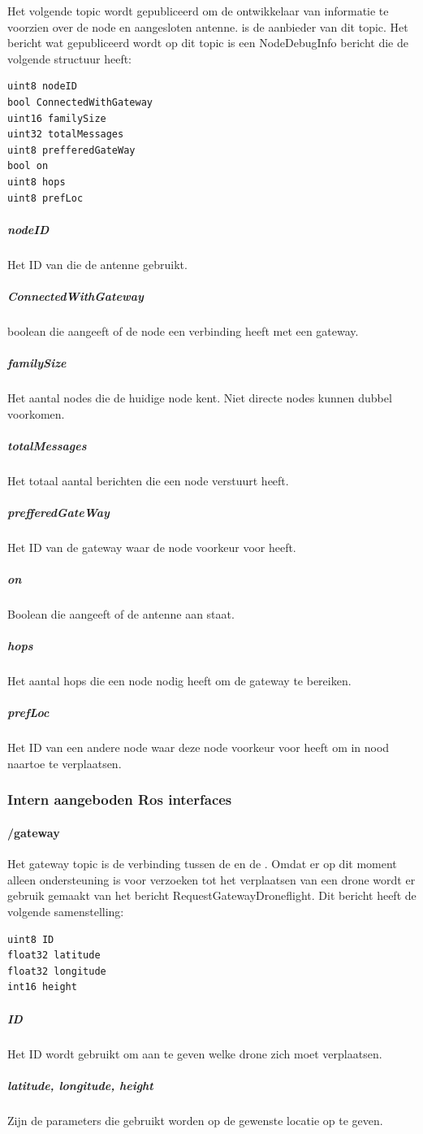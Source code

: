 \documentclass[a4paper, 11pt, oneside]{report}
\begin{document}
Het volgende topic wordt gepubliceerd om de ontwikkelaar van informatie te voorzien over de node en aangesloten antenne.
 is de aanbieder van dit topic.
Het bericht wat gepubliceerd wordt op dit topic is een NodeDebugInfo bericht die de volgende structuur heeft:
\begin{lstlisting}
uint8 nodeID
bool ConnectedWithGateway 
uint16 familySize
uint32 totalMessages
uint8 prefferedGateWay
bool on
uint8 hops
uint8 prefLoc
\end{lstlisting}

\subparagraph{nodeID} Het ID van die de antenne gebruikt. 
\subparagraph{ConnectedWithGateway} boolean die aangeeft of de node een verbinding heeft met een gateway.
\subparagraph{familySize} Het aantal nodes die de huidige node kent. Niet directe nodes kunnen dubbel voorkomen.
\subparagraph{totalMessages} Het totaal aantal berichten die een node verstuurt heeft.
\subparagraph{prefferedGateWay} Het ID van de gateway waar de node voorkeur voor heeft.
\subparagraph{on} Boolean die aangeeft of de antenne aan staat.
\subparagraph{hops} Het aantal hops die een node nodig heeft om de gateway te bereiken.
\subparagraph{prefLoc} Het ID van een andere node waar deze node voorkeur voor heeft om in nood naartoe te verplaatsen. 

\subsubsection{Intern aangeboden Ros interfaces}
\label{DetailedDesign:ros:intern:rosinterfaces}

\paragraph{/gateway}
\label{DetailedDesign:ros:intern:rosinterfaces:topic:gateway}
Het gateway topic is de verbinding tussen de  en de .
Omdat er op dit moment alleen ondersteuning is voor verzoeken tot het verplaatsen van een drone wordt er gebruik gemaakt van het bericht RequestGatewayDroneflight.
Dit bericht heeft de volgende samenstelling:

\begin{lstlisting}
uint8 ID
float32 latitude
float32 longitude
int16 height
\end{lstlisting}

\subparagraph{ID} Het ID wordt gebruikt om aan te geven welke drone zich moet verplaatsen.
\subparagraph{latitude, longitude, height} Zijn de parameters die gebruikt worden op de gewenste locatie op te geven.
\end{document}
